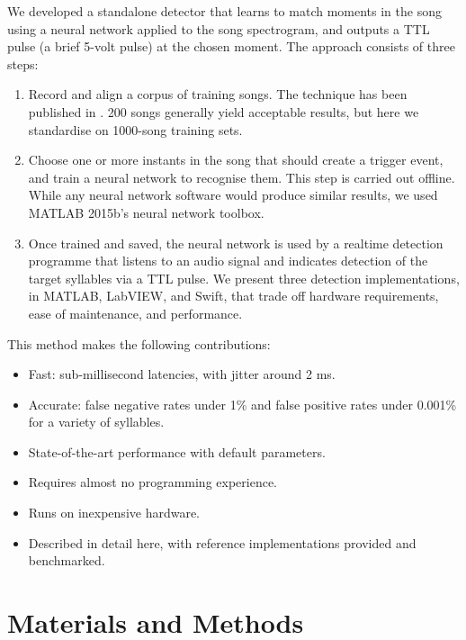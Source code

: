 \documentclass[10pt,letterpaper]{article}
\begin{document}
We developed a standalone detector that learns to match moments in the
song using a neural network applied to the song spectrogram, and
outputs a TTL pulse (a brief 5-volt pulse) at the chosen moment. The
approach consists of three steps:

\begin{enumerate}
\item Record and align a corpus of training songs.  The technique has been published in \cite{Poole2012}. 200 songs generally yield acceptable results, but here we standardise on 1000-song training sets.
\item Choose one or more instants in the song that should create a trigger event, and train a
  neural network to recognise them. This step is carried out offline.  While any neural network software would produce similar results, we used MATLAB 2015b's neural network toolbox.
\item Once trained and saved, the neural network is used by a realtime
  detection programme that listens to an audio signal and indicates detection of the target
  syllables via a TTL pulse.  We present three detection implementations, in MATLAB, LabVIEW, and Swift, that trade off hardware requirements, ease of maintenance, and performance.
\end{enumerate}
This method makes the following contributions:
\begin{itemize}
\item Fast: sub-millisecond latencies, with jitter around 2 ms.
\item Accurate: false negative rates under 1\% and false positive rates under 0.001\% for a variety of syllables.
\item State-of-the-art performance with default parameters.
\item Requires almost no programming experience.
\item Runs on inexpensive hardware.
\item Described in detail here, with reference implementations provided and benchmarked.
\end{itemize}



\section{Materials and Methods}
\label{sec:method}
\end{document}
